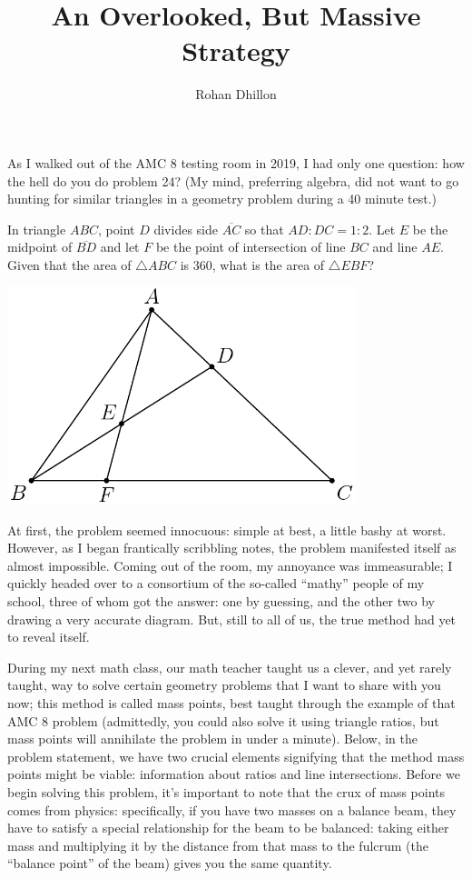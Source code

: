 \documentclass{article}
\title{An Overlooked, But Massive Strategy}
\author{Rohan Dhillon}
\begin{document}
As I walked out of the AMC 8 testing room in 2019, I had only one question: how the hell do you do problem 24? (My mind, preferring algebra, did not want to go hunting for similar triangles in a geometry problem during a 40 minute test.)

In triangle $ABC$, point $D$ divides side $\overline{AC}$ so that $AD:DC=1:2$. Let $E$ be the midpoint of $\overline{BD}$ and let $F$ be the point of intersection of line $BC$ and line $AE$. Given that the area of $\triangle ABC$ is $360$, what is the area of $\triangle EBF$?
\begin{center}
    \includegraphics[width=4in]{images/mass_point_2019_AMC8_P24.png}
\end{center}

At first, the problem seemed innocuous: simple at best, a little bashy at worst. However, as I began frantically scribbling notes, the problem manifested itself as almost impossible. Coming out of the room, my annoyance was immeasurable; I quickly headed over to a consortium of the so-called “mathy” people of my school, three of whom got the answer: one by guessing, and the other two by drawing a very accurate diagram. But, still to all of us, the true method had yet to reveal itself.



During my next math class, our math teacher taught us a clever, and yet rarely taught, way to solve certain geometry problems that I want to share with you now; this method is called mass points, best taught through the example of that AMC 8 problem (admittedly, you could also solve it using triangle ratios, but mass points will annihilate the problem in under a minute). 
Below, in the problem statement, we have two crucial elements signifying that the method mass points might be viable: information about ratios and line intersections. Before we begin solving this problem, it’s important to note that the crux of mass points comes from physics: specifically, if you have two masses on a balance beam, they have to satisfy a special relationship for the beam to be balanced: taking either mass and multiplying it by the distance from that mass to the fulcrum (the “balance point” of the beam) gives you the same quantity. 
\end{document}
